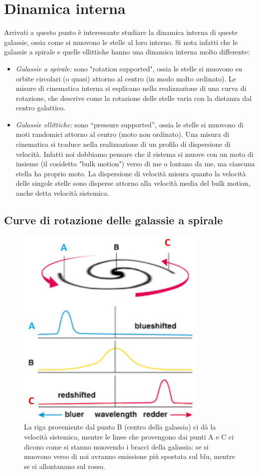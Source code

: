 \section{Dinamica interna}\label{sec:dinamica-interna}
Arrivati a questo punto è interessante studiare la dinamica interna di queste galassie, ossia come si muovono le stelle al loro interno. Si nota infatti che le galassie a spirale e quelle ellittiche hanno una dinamica interna molto differente:

\begin{itemize}
    \item \emph{Galassie a spirale:} sono "rotation supported", ossia le stelle si muovono su orbite circolari (o quasi) attorno al centro (in modo molto ordinato). Le misure di cinematica interna si esplicano nella realizzazione di una curva di rotazione, che descrive come la rotazione delle stelle varia con la distanza dal centro galattico.
    \item \emph{Galassie ellittiche:} sono “pressure supported”, ossia le stelle si muovono di moti randomici attorno al centro (moto non ordinato). Una misura di cinematica si traduce nella realizzazione di un profilo di dispersione di velocità. Infatti noi dobbiamo pensare che il sistema si muove con un moto di insieme (il cosidetto "bulk motion") verso di me o lontano da me, ma ciascuna stella ha proprio moto. La dispersione di velocità misura quanto la velocità delle singole stelle sono disperse attorno alla velocità media del bulk motion, anche detta velocità sistemica.
\end{itemize} 

\subsection{Curve di rotazione delle galassie a spirale}

\begin{figure}
    \centering
    \includegraphics[width = 0.4 \textwidth]{immagini/effetto-doppler.png}
    \caption{La riga proveniente dal punto B (centro della galassia) ci dà la velocità sistemica, mentre le linee che provengono dai punti A e C ci dicono come si stanno muovendo i bracci della galassia: se si muovono verso di noi avranno emissione più spostata sul blu, mentre se si allontanano sul rosso.}
    \label{fig:effetto-doppler-galassie}
\end{figure}

